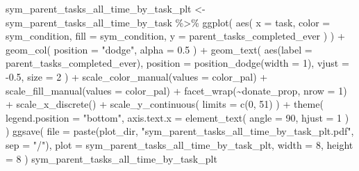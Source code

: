 \documentclass[
]{book}
\newenvironment{Shaded}{\begin{snugshade}}{\end{snugshade}}
\newcommand{\AttributeTok}[1]{\textcolor[rgb]{0.77,0.63,0.00}{#1}}
\newcommand{\DecValTok}[1]{\textcolor[rgb]{0.00,0.00,0.81}{#1}}
\newcommand{\FloatTok}[1]{\textcolor[rgb]{0.00,0.00,0.81}{#1}}
\newcommand{\FunctionTok}[1]{\textcolor[rgb]{0.00,0.00,0.00}{#1}}
\newcommand{\NormalTok}[1]{#1}
\newcommand{\OtherTok}[1]{\textcolor[rgb]{0.56,0.35,0.01}{#1}}
\newcommand{\SpecialCharTok}[1]{\textcolor[rgb]{0.00,0.00,0.00}{#1}}
\newcommand{\StringTok}[1]{\textcolor[rgb]{0.31,0.60,0.02}{#1}}
\begin{document}
\begin{Shaded}
\begin{Highlighting}[]
\NormalTok{sym\_parent\_tasks\_all\_time\_by\_task\_plt }\OtherTok{\textless{}{-}}\NormalTok{ sym\_parent\_tasks\_all\_time\_by\_task }\SpecialCharTok{\%\textgreater{}\%}
  \FunctionTok{ggplot}\NormalTok{(}
    \FunctionTok{aes}\NormalTok{(}
      \AttributeTok{x =}\NormalTok{ task,}
      \AttributeTok{color =}\NormalTok{ sym\_condition,}
      \AttributeTok{fill =}\NormalTok{ sym\_condition,}
      \AttributeTok{y =}\NormalTok{ parent\_tasks\_completed\_ever}
\NormalTok{    )}
\NormalTok{  ) }\SpecialCharTok{+}
  \FunctionTok{geom\_col}\NormalTok{(}
    \AttributeTok{position =} \StringTok{"dodge"}\NormalTok{,}
    \AttributeTok{alpha =} \FloatTok{0.5}
\NormalTok{  ) }\SpecialCharTok{+}
  \FunctionTok{geom\_text}\NormalTok{(}
    \FunctionTok{aes}\NormalTok{(}\AttributeTok{label =}\NormalTok{ parent\_tasks\_completed\_ever),}
    \AttributeTok{position =} \FunctionTok{position\_dodge}\NormalTok{(}\AttributeTok{width =} \DecValTok{1}\NormalTok{),}
    \AttributeTok{vjust =} \SpecialCharTok{{-}}\FloatTok{0.5}\NormalTok{,}
    \AttributeTok{size =} \DecValTok{2}
\NormalTok{  ) }\SpecialCharTok{+}
  \FunctionTok{scale\_color\_manual}\NormalTok{(}\AttributeTok{values =}\NormalTok{ color\_pal) }\SpecialCharTok{+}
  \FunctionTok{scale\_fill\_manual}\NormalTok{(}\AttributeTok{values =}\NormalTok{ color\_pal) }\SpecialCharTok{+}
  \FunctionTok{facet\_wrap}\NormalTok{(}\SpecialCharTok{\textasciitilde{}}\NormalTok{donate\_prop, }\AttributeTok{nrow =} \DecValTok{1}\NormalTok{) }\SpecialCharTok{+}
  \FunctionTok{scale\_x\_discrete}\NormalTok{() }\SpecialCharTok{+}
  \FunctionTok{scale\_y\_continuous}\NormalTok{(}
    \AttributeTok{limits =} \FunctionTok{c}\NormalTok{(}\DecValTok{0}\NormalTok{, }\DecValTok{51}\NormalTok{)}
\NormalTok{  ) }\SpecialCharTok{+}
  \FunctionTok{theme}\NormalTok{(}
    \AttributeTok{legend.position =} \StringTok{"bottom"}\NormalTok{,}
    \AttributeTok{axis.text.x =} \FunctionTok{element\_text}\NormalTok{(}
      \AttributeTok{angle =} \DecValTok{90}\NormalTok{,}
      \AttributeTok{hjust =} \DecValTok{1}
\NormalTok{    )}
\NormalTok{  )}
\FunctionTok{ggsave}\NormalTok{(}
  \AttributeTok{file =} \FunctionTok{paste}\NormalTok{(plot\_dir, }\StringTok{"sym\_parent\_tasks\_all\_time\_by\_task\_plt.pdf"}\NormalTok{, }\AttributeTok{sep =} \StringTok{"/"}\NormalTok{),}
  \AttributeTok{plot =}\NormalTok{ sym\_parent\_tasks\_all\_time\_by\_task\_plt,}
  \AttributeTok{width =} \DecValTok{8}\NormalTok{,}
  \AttributeTok{height =} \DecValTok{8}
\NormalTok{)}
\NormalTok{sym\_parent\_tasks\_all\_time\_by\_task\_plt}
\end{Highlighting}
\end{Shaded}
\end{document}
